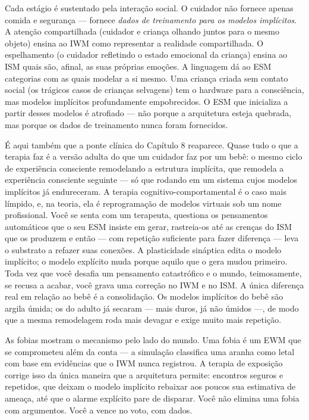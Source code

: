 \documentclass[11pt, twoside, openright]{book}
\begin{document}
Cada estágio é sustentado pela interação social. O cuidador não fornece apenas comida e segurança --- fornece \textit{dados de treinamento para os modelos implícitos}. A atenção compartilhada (cuidador e criança olhando juntos para o mesmo objeto) ensina ao IWM como representar a realidade compartilhada. O espelhamento (o cuidador refletindo o estado emocional da criança) ensina ao ISM quais são, afinal, as suas próprias emoções. A linguagem dá ao ESM categorias com as quais modelar a si mesmo. Uma criança criada sem contato social (os trágicos casos de crianças selvagens) tem o hardware para a consciência, mas modelos implícitos profundamente empobrecidos. O ESM que inicializa a partir desses modelos é atrofiado --- não porque a arquitetura esteja quebrada, mas porque os dados de treinamento nunca foram fornecidos.

É aqui também que a ponte clínica do Capítulo 8 reaparece. Quase tudo o que a terapia faz é a versão adulta do que um cuidador faz por um bebê: o mesmo ciclo de experiência consciente remodelando a estrutura implícita, que remodela a experiência consciente seguinte --- só que rodando em um sistema cujos modelos implícitos já endureceram. A terapia cognitivo-comportamental é o caso mais límpido, e, na teoria, ela é reprogramação de modelos virtuais sob um nome profissional. Você se senta com um terapeuta, questiona os pensamentos automáticos que o seu ESM insiste em gerar, rastreia-os até as crenças do ISM que os produzem e então --- com repetição suficiente para fazer diferença --- leva o substrato a refazer suas conexões. A plasticidade sináptica edita o modelo implícito; o modelo explícito muda porque aquilo que o gera mudou primeiro. Toda vez que você desafia um pensamento catastrófico e o mundo, teimosamente, se recusa a acabar, você grava uma correção no IWM e no ISM. A única diferença real em relação ao bebê é a consolidação. Os modelos implícitos do bebê são argila úmida; os do adulto já secaram --- mais duros, já não úmidos ---, de modo que a mesma remodelagem roda mais devagar e exige muito mais repetição.

As fobias mostram o mecanismo pelo lado do mundo. Uma fobia é um EWM que se comprometeu além da conta --- a simulação classifica uma aranha como letal com base em evidências que o IWM nunca registrou. A terapia de exposição corrige isso da única maneira que a arquitetura permite: encontros seguros e repetidos, que deixam o modelo implícito rebaixar aos poucos sua estimativa de ameaça, até que o alarme explícito pare de disparar. Você não elimina uma fobia com argumentos. Você a vence no voto, com dados.
\end{document}
